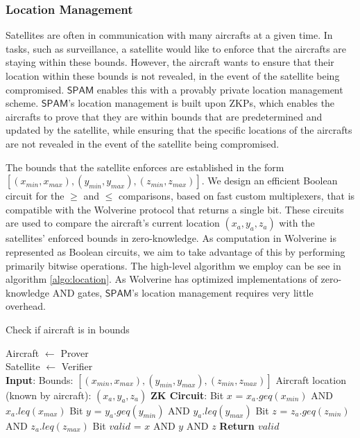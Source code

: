\documentclass[9pt,sigconf,screen]{acmart}
\newcommand\sys{$\mathsf{SPAM}$\xspace}
\begin{document}
\subsubsection{Location Management}
Satellites are often in communication with many aircrafts at a given time. In tasks, such as surveillance, a satellite would like to enforce that the aircrafts are staying within these bounds. However, the aircraft wants to ensure that their location within these bounds is not revealed, in the event of the satellite being compromised. \sys enables this with a provably private location management scheme. \sys's location management is built upon ZKPs, which enables the aircrafts to prove that they are within bounds that are predetermined and updated by the satellite, while ensuring that the specific locations of the aircrafts are not revealed in the event of the satellite being compromised.

The bounds that the satellite enforces are established in the form $[(x_{min}, x_{max}), (y_{min}, y_{max}), (z_{min}, z_{max})]$. We design an efficient Boolean circuit for the $\geq$ and $\leq$ comparisons, based on fast custom multiplexers, that is compatible with the Wolverine protocol that returns a single bit. These circuits are used to compare the aircraft's current location $(x_a, y_a, z_a)$ with the satellites' enforced bounds in zero-knowledge. As computation in Wolverine is represented as Boolean circuits, we aim to take advantage of this by performing primarily bitwise operations. The high-level algorithm we employ can be see in algorithm \ref{algo:location}. As Wolverine has optimized implementations of zero-knowledge AND gates, \sys's location management requires very little overhead.

\begin{algorithm}
\caption{Check if aircraft is in bounds}
\label{algo:location}
\begin{algorithmic}
\STATE Aircraft $\gets$ Prover\\
\STATE Satellite $\gets$ Verifier\\
\STATE \textbf{Input}:
\STATE Bounds: $[(x_{min}, x_{max}), (y_{min}, y_{max}), (z_{min}, z_{max})]$
\STATE Aircraft location (known by aircraft): $(x_a, y_a, z_a)$
\STATE \textbf{ZK Circuit}:
\STATE Bit $x$ = $x_a.geq(x_{min})$ AND $x_{a}.leq(x_{max})$
\STATE Bit $y$ = $y_a.geq(y_{min})$ AND $y_{a}.leq(y_{max})$
\STATE Bit $z$ = $z_a.geq(z_{min})$ AND $z_{a}.leq(z_{max})$
\STATE Bit $valid$ = $x$ AND $y$ AND $z$
\STATE \textbf{Return $valid$}
\end{algorithmic}

\end{algorithm}
\end{document}
